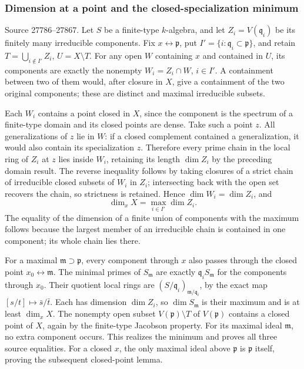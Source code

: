 \subsubsection{Dimension at a point and the closed-specialization minimum}\label{algebra-proof-025-dimension-at-a-point-and-the-closed-specialization-minimum}

Source 27786--27867. Let \(S\) be a finite-type \(k\)-algebra, and let \(Z_i=V(\mathfrak q_i)\) be its finitely many irreducible components. Fix \(x\leftrightarrow\mathfrak p\), put \(I'=\{i:\mathfrak q_i\subset
\mathfrak p\}\), and retain \(T=\bigcup_{i\notin I'}Z_i\), \(U=X\setminus T\). For any open \(W\) containing \(x\) and contained in \(U\), its components are exactly the nonempty \(W_i=Z_i\cap W\), \(i\in I'\). A containment between two of them would, after closure in \(X\), give a containment of the two original components; these are distinct and maximal irreducible subsets.

Each \(W_i\) contains a point closed in \(X\), since the component is the spectrum of a finite-type domain and its closed points are dense. Take such a point \(z\). All generalizations of \(z\) lie in \(W\): if a closed complement contained a generalization, it would also contain its specialization \(z\). Therefore every prime chain in the local ring of \(Z_i\) at \(z\) lies inside \(W_i\), retaining its length \(\dim Z_i\) by the preceding domain result. The reverse inequality follows by taking closures of a strict chain of irreducible closed subsets of \(W_i\) in \(Z_i\); intersecting back with the open set recovers the chain, so strictness is retained. Hence \(\dim W_i=\dim Z_i\), and \[
 \dim_x X=\max_{i\in I'}\dim Z_i.
\] The equality of the dimension of a finite union of components with the maximum follows because the largest member of an irreducible chain is contained in one component; its whole chain lies there.

For a maximal \(\mathfrak m\supset\mathfrak p\), every component through \(x\) also passes through the closed point \(x_0\leftrightarrow\mathfrak m\). The minimal primes of \(S_{\mathfrak m}\) are exactly \(\mathfrak q_i S_{\mathfrak m}\) for the components through \(x_0\). Their quotient local rings are \((S/\mathfrak q_i)_{\mathfrak m/\mathfrak q_i}\), by the exact map \([s/t]\mapsto\bar s/\bar t\). Each has dimension \(\dim Z_i\), so \(\dim S_{\mathfrak m}\) is their maximum and is at least \(\dim_xX\). The nonempty open subset \(V(\mathfrak p)\setminus T\) of \(V(\mathfrak p)\) contains a closed point of \(X\), again by the finite-type Jacobson property. For its maximal ideal \(\mathfrak m\), no extra component occurs. This realizes the minimum and proves all three source equalities. For a closed \(x\), the only maximal ideal above \(\mathfrak p\) is \(\mathfrak p\) itself, proving the subsequent closed-point lemma.

